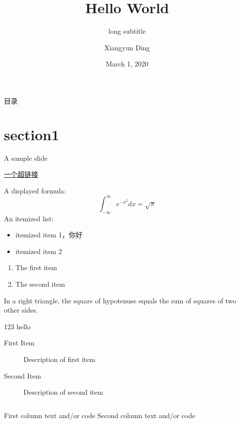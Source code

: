 \documentclass[10pt]{beamer}
\title{Hello World}
\subtitle[short subtitle]{long subtitle}
\author[dxy]{Xiangyun Ding}
\institute[计65]{\large{姓名：丁相允}\and\large{哈哈哈哈}}
\date{March 1, 2020}  %
\begin{document}
\frame{\titlepage}

\section[目录]{}   %
\begin{frame}{目录}
\tableofcontents
\end{frame}

\section{section1}

\begin{frame}{A sample slide}

  \href{http://v.youku.com/}{一个超链接} 

A displayed formula:
\[
  \int_{-\infty}^\infty e^{-x^2}dx = \sqrt{\pi}
\]
An itemized list:

\begin{itemize}
  \item itemized item 1，你好
  \item itemized item 2
\end{itemize}
\begin{enumerate}
  \item The first item
  \item The second item
\end{enumerate}

\end{frame}

\begin{frame}

\begin{theorem}{1.1}
  In a right triangle, \small{the square of hypotenuse equals
  the sum of squares of two} other sides.
\end{theorem}

\begin{block}{123}
  hello
\end{block}

\begin{description}
  \item[First Item] Description of first item
  \vspace{0.5cm}  %
  \item[Second Item] Description of second item
\end{description}

\begin{columns}
  First column text and/or code
  Second column text and/or code
\end{columns}

\end{frame}
\end{document}
